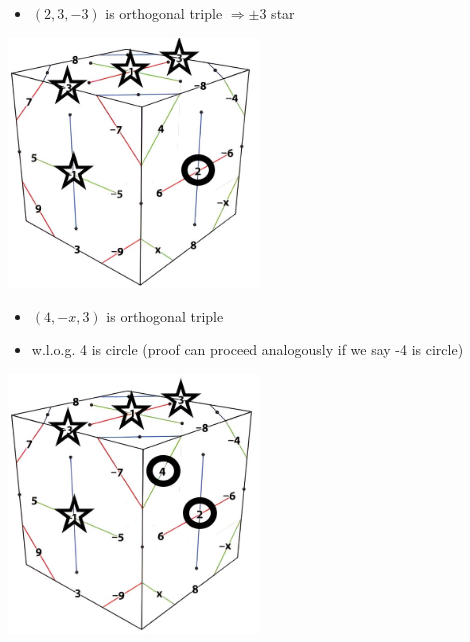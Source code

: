 \documentclass{beamer}
\begin{document}
\begin{frame}
\begin{itemize}
\item $(2,3,-3)$ is orthogonal triple $\Rightarrow\pm3$ star
\end{itemize}
\begin{center}
\includegraphics[width=0.5\textwidth]{KSProof02.jpg}
\end{center}
\end{frame}

\begin{frame}
\begin{itemize}
\item $(4,-x,3)$ is orthogonal triple 
\item w.l.o.g. 4 is circle (proof can proceed analogously if we say -4 is circle)
\end{itemize}
\begin{center}
\includegraphics[width=0.5\textwidth]{KSProof03.jpg}
\end{center}
\end{frame}
\end{document}
